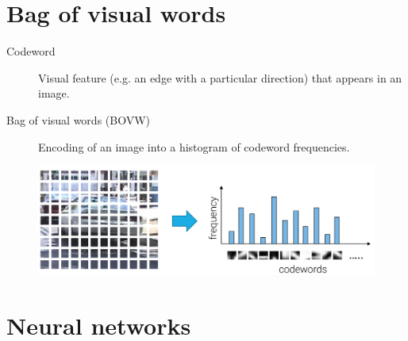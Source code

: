 \section{Bag of visual words}

\begin{description}
    \item[Codeword] 
        Visual feature (e.g. an edge with a particular direction) that appears in an image.

    \item[Bag of visual words (BOVW)] 
        Encoding of an image into a histogram of codeword frequencies.
\end{description}

\begin{figure}[H]
    \centering
    \includegraphics[width=0.6\linewidth]{./img/bovw.png}
\end{figure}



\section{Neural networks}

